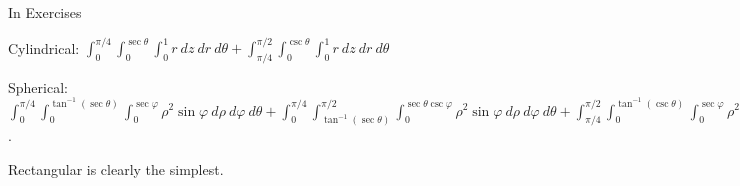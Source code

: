 \begin{exerciseset}{In Exercises}
{Cylindrical: $\int_0^{\pi/4}\int_0^{\sec\theta}\int_{0}^{1}r\ dz\ dr\ d\theta +
 \int_{\pi/4}^{\pi/2}\int_0^{\csc\theta}\int_{0}^{1}r\ dz\ dr\ d\theta$

Spherical: $\int _0^{\pi/4}\int _0^{\tan ^{-1}(\sec \theta)}\int _0^{\sec \varphi}\rho ^2 \sin\varphi\ d\rho\ d\varphi\ d \theta +
	\int _0^{\pi/4}\int _{\tan ^{-1}(\sec \theta)}^{\pi/2}\int _0^{\sec\theta\csc\varphi}\rho ^2 \sin\varphi\ d\rho\ d\varphi\ d \theta +
	\int _{\pi/4}^{\pi/2}\int _0^{\tan ^{-1}(\csc \theta)}\int _0^{\sec\varphi}\rho ^2 \sin\varphi\ d\rho\ d\varphi\ d \theta +
	\int _{\pi/4}^{\pi/2}\int _{\tan ^{-1}(\csc \theta)}^{\pi/2}\int _0^{\csc\theta\csc\varphi}\rho ^2 \sin\varphi\ d\rho\ d\varphi\ d \theta$.

Rectangular is clearly the simplest.}

\end{exerciseset}
